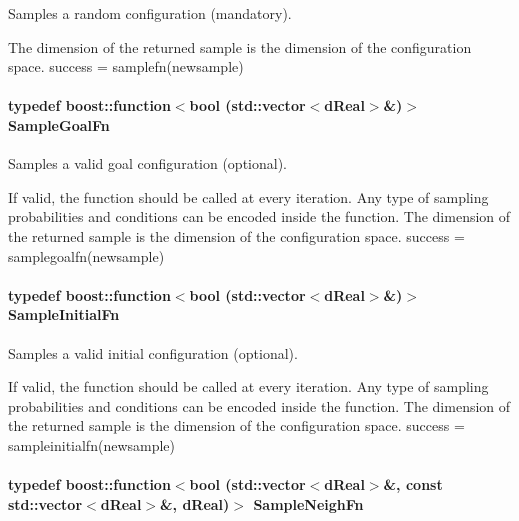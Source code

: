 Samples a random configuration (mandatory). 

The dimension of the returned sample is the dimension of the configuration space. success = samplefn(newsample) \hypertarget{classOpenRAVE_1_1PlannerBase_1_1PlannerParameters_a60329a58cd803c66dc0701e9944d8ed9}{
\paragraph[{SampleGoalFn}]{\setlength{\rightskip}{0pt plus 5cm}typedef boost::function$<$bool (std::vector$<$dReal$>$\&)$>$ {\bf SampleGoalFn}}\hfill}
\label{classOpenRAVE_1_1PlannerBase_1_1PlannerParameters_a60329a58cd803c66dc0701e9944d8ed9}


Samples a valid goal configuration (optional). 

If valid, the function should be called at every iteration. Any type of sampling probabilities and conditions can be encoded inside the function. The dimension of the returned sample is the dimension of the configuration space. success = samplegoalfn(newsample) \hypertarget{classOpenRAVE_1_1PlannerBase_1_1PlannerParameters_a8cd1af608ebe03bf544992b322e6f5aa}{
\paragraph[{SampleInitialFn}]{\setlength{\rightskip}{0pt plus 5cm}typedef boost::function$<$bool (std::vector$<$dReal$>$\&)$>$ {\bf SampleInitialFn}}\hfill}
\label{classOpenRAVE_1_1PlannerBase_1_1PlannerParameters_a8cd1af608ebe03bf544992b322e6f5aa}


Samples a valid initial configuration (optional). 

If valid, the function should be called at every iteration. Any type of sampling probabilities and conditions can be encoded inside the function. The dimension of the returned sample is the dimension of the configuration space. success = sampleinitialfn(newsample) \hypertarget{classOpenRAVE_1_1PlannerBase_1_1PlannerParameters_a78bb26c318f93bce6e3ea11fc95a99fc}{
\paragraph[{SampleNeighFn}]{\setlength{\rightskip}{0pt plus 5cm}typedef boost::function$<$bool (std::vector$<$dReal$>$\&, const std::vector$<$dReal$>$\&, dReal)$>$ {\bf SampleNeighFn}}\hfill}
\label{classOpenRAVE_1_1PlannerBase_1_1PlannerParameters_a78bb26c318f93bce6e3ea11fc95a99fc}


